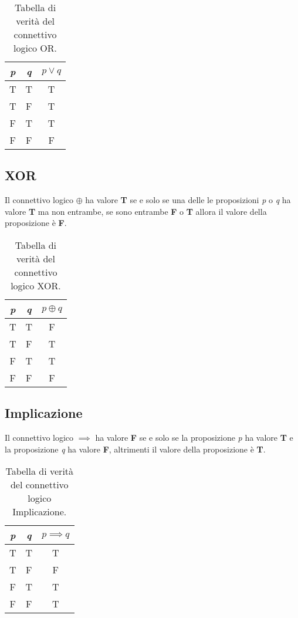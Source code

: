 \begin{table}[H]
    \centering
    \caption{\label{tab:true_table_OR}Tabella di verità del connettivo logico OR.}
    \begin{tabular}{|c | c || c ||} 
     \hline
     \textit{p} & \textit{q} & $p \vee q$ \\
     \hline\hline
     T & T & T \\ 
     \hline
     T & F & T \\
     \hline
     F & T & T \\
     \hline
     F & F & F \\
     \hline
    \end{tabular}
\end{table}

\subsection{XOR}
Il connettivo logico \textbf{$\oplus$} ha valore \textbf{T} se e solo se una delle le proposizioni \textit{p} o \textit{q} ha valore \textbf{T} ma non entrambe, se sono entrambe \textbf{F} o \textbf{T} allora il valore della proposizione è \textbf{F}.

\begin{table}[H]
    \centering
    \caption{\label{tab:XOR}Tabella di verità del connettivo logico XOR.}
    \begin{tabular}{|c | c || c ||} 
     \hline
     \textit{p} & \textit{q} & $p \oplus q$ \\
     \hline\hline
     T & T & F \\ 
     \hline
     T & F & T \\
     \hline
     F & T & T \\
     \hline
     F & F & F \\
     \hline
    \end{tabular}
\end{table}

\subsection{Implicazione}
Il connettivo logico \textbf{$\implies$} ha valore \textbf{F} se e solo se la proposizione \textit{p} ha valore \textbf{T} e la proposizione \textit{q} ha valore \textbf{F}, altrimenti il valore della proposizione è \textbf{T}.

\begin{table}[H]
    \centering    
    \caption{\label{tab:true_table_implies}Tabella di verità del connettivo logico Implicazione.}
    \begin{tabular}{|c | c || c ||} 
     \hline
     \textit{p} & \textit{q} & $p \implies q$ \\
     \hline\hline
     T & T & T \\ 
     \hline
     T & F & F \\
     \hline
     F & T & T \\
     \hline
     F & F & T \\
     \hline
    \end{tabular}
\end{table}

